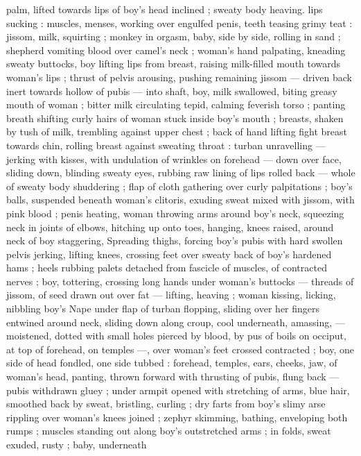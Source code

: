 {palm, lifted towards lips of boy's head inclined ; sweaty body 
heaving. lips sucking : muscles, menses, working over engulfed 
penis, teeth teasing grimy teat : jissom, milk, squirting ; monkey in 
orgasm, baby, side by side, rolling in sand ; shepherd vomiting blood 
over camel's neck ; woman's hand palpating, kneading sweaty 
buttocks, boy lifting lips from breast, raising milk-filled mouth 
towards woman's lips ; thrust of pelvis arousing, pushing remaining 
jissom --- driven back inert towards hollow of pubis --- into shaft, 
boy, milk swallowed, biting greasy mouth of woman ; bitter milk 
circulating tepid, calming feverish torso ; panting breath shifting 
curly hairs of woman stuck inside boy's mouth ; breasts, shaken by 
tush of milk, trembling against upper chest ; back of hand lifting 
fight breast towards chin, rolling breast against sweating throat : 
turban unravelling --- jerking with kisses, with undulation of wrinkles 
on forehead --- down over face, sliding down, blinding sweaty eyes, 
rubbing raw lining of lips rolled back --- whole of sweaty body 
shuddering ; flap of cloth gathering over curly palpitations ; boy's 
balls, suspended beneath woman's clitoris, exuding sweat mixed with 
jissom, with pink blood ; penis heating, woman throwing arms around 
boy's neck, squeezing neck in joints of elbows, hitching up onto 
toes, hanging, knees raised, around neck of boy staggering, 
Spreading thighs, forcing boy's pubis with hard swollen pelvis 
jerking, lifting knees, crossing feet over sweaty back of boy's 
hardened hams ; heels rubbing palets detached from fascicle of 
muscles, of contracted nerves ; boy, tottering, crossing long hands 
under woman's buttocks --- threads of jissom, of seed drawn out 
over fat --- lifting, heaving ; woman kissing, licking, nibbling boy's 
Nape under flap of turban flopping, sliding over her fingers entwined 
around neck, sliding down along croup, cool underneath, amassing, 
--- moistened, dotted with small holes pierced by blood, by pus of 
boils on occiput, at top of forehead, on temples ---, over woman's 
feet crossed contracted ; boy, one side of head fondled, one side 
tubbed : forehead, temples, ears, cheeks, jaw, of woman's head, 
panting, thrown forward with thrusting of pubis, flung back --- pubis 
withdrawn gluey ; under armpit opened with stretching of arms, blue 
hair, smoothed back by sweat, bristling, curling ; dry farts from boy's 
slimy arse rippling over woman's knees joined ; zephyr skimming, 
bathing, enveloping both rumps ; muscles standing out along boy's 
outstretched arms ; in folds, sweat exuded, rusty ; baby, underneath 
}
